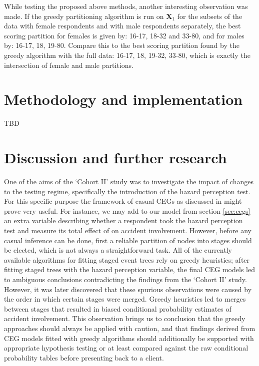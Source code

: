 \documentclass[runningheads]{llncs}
\begin{document}
While testing the proposed above methods, another interesting observation was made. If the greedy partitioning algorithm is run on $\boldsymbol{X}_1$ for the subsets of the data with female respondents and with male respondents separately, the best scoring partition for females is given by: 16-17, 18-32 and 33-80, and for males by: 16-17, 18, 19-80. Compare this to the best scoring partition found by the greedy algorithm with the full data: 16-17, 18, 19-32, 33-80, which is exactly the intersection of female and male partitions.

%
%
\section{Methodology and implementation}
TBD


%
%
\section{Discussion and further research}\label{sec:discussion}
One of the aims of the `Cohort II' study was to investigate the impact of changes to the testing regime, specifically the introduction of the hazard perception test. For this specific purpose the framework of casual CEGs as discussed in \cite{smith2017cegs} might prove very useful. For instance, we may add to our model from section \ref{sec:cegs} an extra variable describing whether a respondent took the hazard perception test and measure its total effect of on accident involvement. However, before any casual inference can be done, first a reliable partition of nodes into stages should be elected, which is not always a straightforward task. All of the currently available algorithms for fitting staged event trees rely on greedy heuristics; after fitting staged trees with the hazard perception variable, the final CEG models led to ambiguous conclusions contradicting the findings from the `Cohort II' study. However, it was later discovered that these spurious observations were caused by the order in which certain stages were merged. Greedy heuristics led to merges between stages that resulted in biased conditional probability estimates of accident involvement. This observation brings us to conclusion that the greedy approaches should always be applied with caution, and that findings derived from CEG models fitted with greedy algorithms should additionally be supported with appropriate hypothesis testing or at least compared against the raw conditional probability tables before presenting back to a client. 
\end{document}
